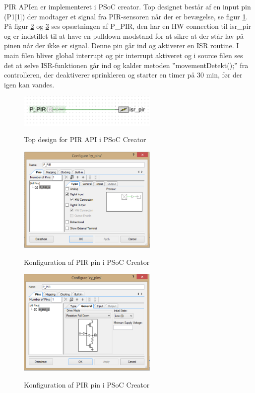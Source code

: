 PIR APIen er implementeret i PSoC creator. Top designet består af en input pin (P1[1]) der modtager et signal fra PIR-sensoren når der er bevægelse, se figur \ref{lab:pir_topdesign}. På figur \ref{lab:pir_topdesign_1} og \ref{lab:pir_topdesign_2} ses opsætningen af P\_PIR, den har en HW connection til isr\_pir og er indstillet til at have en pulldown modstand for at sikre at der står lav på pinen når der ikke er signal. Denne pin går ind og aktiverer en ISR routine. I main filen bliver global interrupt og pir interrupt aktiveret og i source filen ses det at selve ISR-funktionen går ind og kalder metoden ''movementDetekt();'' fra controlleren, der deaktiverer sprinkleren og starter en timer på 30 min, før der igen kan vandes.


\begin{figure}[htb]
\centering
{\includegraphics[width=0.60\textwidth]{filer/pics/pir_api_topdesign}}
\caption{Top design for PIR API i PSoC Creator}
\label{lab:pir_topdesign}
\end{figure}

\begin{figure}[htb]
\centering
{\includegraphics[width=0.60\textwidth]{filer/pics/pir_api_topdesign_1}}
\caption{Konfiguration af PIR pin i PSoC Creator}
\label{lab:pir_topdesign_1}
\end{figure}

\begin{figure}[H]
\centering
{\includegraphics[width=0.60\textwidth]{filer/pics/pir_api_topdesign_2}}
\caption{Konfiguration af PIR pin i PSoC Creator}
\label{lab:pir_topdesign_2}
\end{figure}

